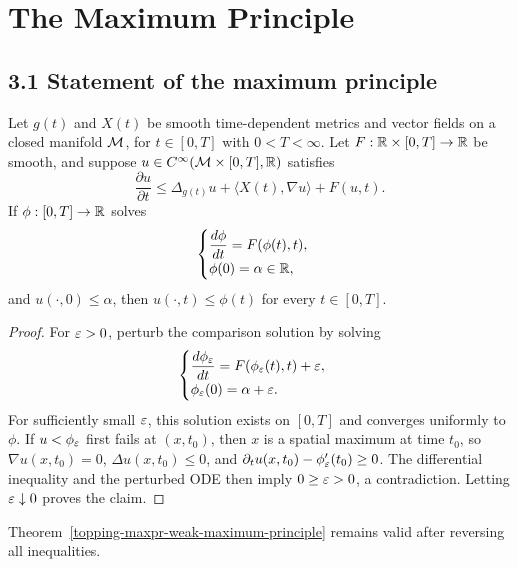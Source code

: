 \chapter{The Maximum Principle}

\section*{3.1 \quad Statement of the maximum principle}

\begin{theorem}
\label{topping-maxpr-weak-maximum-principle}
\leanok
Let $g(t)$ and $X(t)$ be smooth time-dependent metrics and vector fields on a
closed manifold $\mathcal{M}$, for $t\in[0,T]$ with $0<T<\infty$. Let
$F:\mathbb{R}\times[0,T]\to\mathbb{R}$ be smooth, and suppose
$u\in C^\infty(\mathcal{M}\times[0,T],\mathbb{R})$ satisfies
\[
\frac{\partial u}{\partial t}
\leq \Delta_{g(t)}u+\langle X(t),\nabla u\rangle+F(u,t).
\]
If $\phi:[0,T]\to\mathbb{R}$ solves
\[
\begin{cases}
\dfrac{d\phi}{dt}=F(\phi(t),t),\\
\phi(0)=\alpha\in\mathbb{R},
\end{cases}
\]
and $u(\cdot,0)\leq\alpha$, then $u(\cdot,t)\leq\phi(t)$ for every
$t\in[0,T]$.
\end{theorem}

\begin{proof}
\sketch For $\varepsilon>0$, perturb the comparison solution by solving
\[
\begin{cases}
\dfrac{d\phi_\varepsilon}{dt}=F(\phi_\varepsilon(t),t)+\varepsilon,\\
\phi_\varepsilon(0)=\alpha+\varepsilon.
\end{cases}
\]
For sufficiently small $\varepsilon$, this solution exists on $[0,T]$ and converges
uniformly to $\phi$. If $u<\phi_\varepsilon$ first fails at $(x,t_0)$, then $x$ is a
spatial maximum at time $t_0$, so $\nabla u(x,t_0)=0$, $\Delta u(x,t_0)\leq0$,
and $\partial_tu(x,t_0)-\phi_\varepsilon'(t_0)\geq0$. The differential inequality and
the perturbed ODE then imply $0\geq\varepsilon>0$, a contradiction. Letting
$\varepsilon\downarrow0$ proves the claim.
\end{proof}

\begin{corollary}
\label{topping-maxpr-weak-minimum-principle}
\leanok
Theorem~\ref{topping-maxpr-weak-maximum-principle} remains valid after reversing all inequalities.
\end{corollary}

